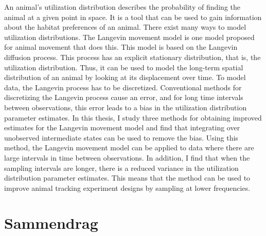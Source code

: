 

An animal's utilization distribution describes the probability of finding the animal at a given point in space. It is a tool that can be used to gain information about the habitat preferences of an animal. There exist many ways to model utilization distributions. The Langevin movement model is one model proposed for animal movement that does this. This model is based on the Langevin diffusion process. This process has an explicit stationary distribution, that is, the utilization distribution. Thus, it can be used to model the long-term spatial distribution of an animal by looking at its displacement over time. To model data, the Langevin process has to be discretized. Conventional methods for discretizing the Langevin process cause an error, and for long time intervals between observations, this error leads to a bias in the utilization distribution parameter estimates. In this thesis, I study three methods for obtaining improved estimates for the Langevin movement model and find that integrating over unobserved intermediate states can be used to remove the bias. Using this method, the Langevin movement model can be applied to data where there are large intervals in time between observations. In addition, I find that when the sampling intervals are longer, there is a reduced variance in the utilization distribution parameter estimates. This means that the method can be used to improve animal tracking experiment designs by sampling at lower frequencies. 






\newpage
\null
\thispagestyle{empty}
\newpage

\chapter*{Sammendrag}

